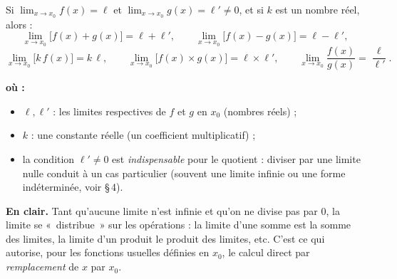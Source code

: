 \documentclass[11pt,a4paper]{article}
\newenvironment{ou}{%
  \par\smallskip\noindent\textbf{où :}\nopagebreak
  \begin{itemize}[leftmargin=1.8em,topsep=2pt,itemsep=1.5pt,parsep=0pt]}%
  {\end{itemize}}
\begin{document}
\begin{center}
\end{center}

\begin{theoreme}
Si $\displaystyle\lim_{x\to x_0} f(x)=\ell$ et $\displaystyle\lim_{x\to x_0} g(x)=\ell'\neq 0$, et si $k$ est un nombre réel, alors :
\[
\lim_{x\to x_0}\bigl[f(x)+g(x)\bigr]=\ell+\ell',\qquad
\lim_{x\to x_0}\bigl[f(x)-g(x)\bigr]=\ell-\ell',
\]
\[
\lim_{x\to x_0}\bigl[k\,f(x)\bigr]=k\,\ell,\qquad
\lim_{x\to x_0}\bigl[f(x)\times g(x)\bigr]=\ell\times\ell',\qquad
\lim_{x\to x_0}\frac{f(x)}{g(x)}=\frac{\ell}{\ell'}.
\]
\end{theoreme}

\begin{ou}
  \item $\ell,\ell'$ : les limites respectives de $f$ et $g$ en $x_0$ (nombres réels) ;
  \item $k$ : une constante réelle (un coefficient multiplicatif) ;
  \item la condition $\ell'\neq 0$ est \emph{indispensable} pour le quotient : diviser par une limite nulle conduit à un cas particulier (souvent une limite infinie ou une forme indéterminée, voir \S\,4).
\end{ou}

\noindent\textbf{En clair.} Tant qu'aucune limite n'est infinie et qu'on ne divise pas par $0$, la
limite se «~distribue~» sur les opérations : la limite d'une somme est la somme des limites, la
limite d'un produit le produit des limites, etc. C'est ce qui autorise, pour les fonctions
usuelles définies en $x_0$, le calcul direct par \emph{remplacement} de $x$ par $x_0$.
\end{document}
